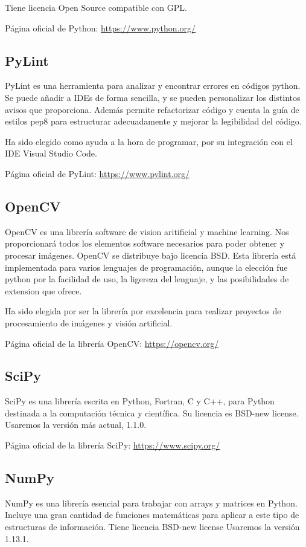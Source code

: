 Tiene licencia Open Source compatible con GPL.

Página oficial de Python: \url{https://www.python.org/}

\subsection{PyLint}
PyLint es una herramienta para analizar y encontrar errores en códigos python. Se puede añadir a IDEs de forma sencilla, y se pueden personalizar los distintos avisos que proporciona. 
Además permite refactorizar código y cuenta la guía de estilos pep8\cite{pep8} para estructurar adecuadamente y mejorar la legibilidad del código.

Ha sido elegido como ayuda a la hora de programar, por su integración con el IDE Visual Studio Code.

Página oficial de PyLint: \url{https://www.pylint.org/}

\subsection{OpenCV}
OpenCV es una librería software de vision aritificial y machine learning. Nos proporcionará todos los elementos software necesarios para poder obtener y procesar imágenes. 
OpenCV se distribuye bajo licencia BSD. 
Esta librería está implementada para varios lenguajes de programación, aunque la elección fue python por la facilidad de uso, la ligereza del lenguaje, y las posibilidades de extension que ofrece.

Ha sido elegida por ser la librería por excelencia para realizar proyectos de procesamiento de imágenes y visión artificial.

Página oficial de la librería OpenCV: \url{https://opencv.org/}

\subsection{SciPy}
SciPy es una librería escrita en Python, Fortran, C y C++, para Python destinada a la computación técnica y científica. 
Su licencia es BSD-new license.
Usaremos la versión más actual, 1.1.0.

Página oficial de la librería SciPy: \url{https://www.scipy.org/}

\subsection{NumPy}
NumPy es una librería esencial para trabajar con arrays y matrices en Python. Incluye una gran cantidad de funciones matemáticas para aplicar a este tipo de estructuras de información.
Tiene licencia BSD-new license
Usaremos la versión 1.13.1.

